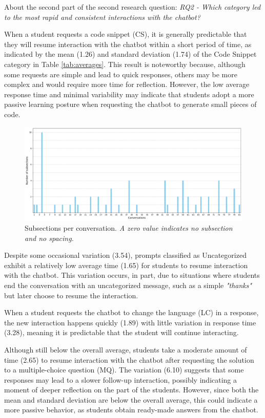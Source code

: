 \documentclass[a4paper,twoside]{article}
\begin{document}
About the second part of the second research question: \textit{RQ2 - Which
category led to the most rapid and consistent interactions with the chatbot?}

When a student requests a code snippet (CS), it is generally predictable that
they will resume interaction with the chatbot within a short period of time, as
indicated by the mean (1.26) and standard deviation (1.74) of the Code Snippet
category in Table \ref{tab:averages}. This result is noteworthy because,
although some requests are simple and lead to quick responses, others may be
more complex and would require more time for reflection. However, the low
average response time and minimal variability may indicate that students adopt a
more passive learning posture when requesting the chatbot to generate small pieces
of code.

\begin{figure}[htbp]
  \centering
  \includegraphics[scale=0.39]{img/figure3.png}
  \caption{Subsections per conversation. \textit{A zero value indicates
  no subsection and no spacing.}}
  \label{fig:graph3}
\end{figure}

Despite some occasional variation (3.54), prompts classified as Uncategorized
exhibit a relatively low average time (1.65) for students to resume interaction
with the chatbot. This variation occurs, in part, due to situations where students
end the conversation with an uncategorized message, such as a simple
\textit{"thanks"} but later choose to resume the interaction.

When a student requests the chatbot to change the language (LC) in a response, the
new interaction happens quickly (1.89) with little variation in response time
(3.28), meaning it is predictable that the student will continue interacting.

Although still below the overall average, students take a moderate amount of
time (2.65) to resume interaction with the chatbot after requesting the solution to
a multiple-choice question (MQ). The variation (6.10) suggests that some
responses may lead to a slower follow-up interaction, possibly indicating a
moment of deeper reflection on the part of the students. However, since both the
mean and standard deviation are below the overall average, this could indicate
a more passive behavior, as students obtain ready-made answers from the chatbot.
\end{document}
